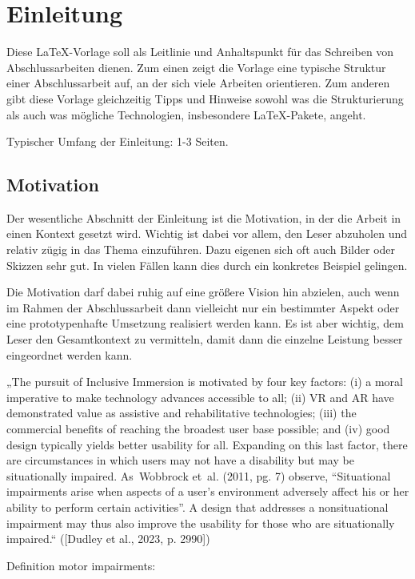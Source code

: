 \chapter{Einleitung}

Diese \LaTeX-Vorlage soll als Leitlinie und Anhaltspunkt für das Schreiben von Abschlussarbeiten dienen. Zum einen zeigt die Vorlage eine typische Struktur einer Abschlussarbeit auf, an der sich viele Arbeiten orientieren. Zum anderen gibt diese Vorlage gleichzeitig Tipps und Hinweise sowohl was die Strukturierung als auch was mögliche Technologien, insbesondere \LaTeX-Pakete, angeht.

Typischer Umfang der Einleitung: 1-3 Seiten.

\section{Motivation}

Der wesentliche Abschnitt der Einleitung ist die Motivation, in der die Arbeit in einen Kontext gesetzt wird. Wichtig ist dabei vor allem, den Leser abzuholen und relativ zügig in das Thema einzuführen. Dazu eigenen sich oft auch Bilder oder Skizzen sehr gut. In vielen Fällen kann dies durch ein konkretes Beispiel gelingen.

Die Motivation darf dabei ruhig auf eine größere Vision hin abzielen, auch wenn im Rahmen der Abschlussarbeit dann vielleicht nur ein bestimmter Aspekt oder eine prototypenhafte Umsetzung realisiert werden kann. Es ist aber wichtig, dem Leser den Gesamtkontext zu vermitteln, damit dann die einzelne Leistung besser eingeordnet werden kann.

„The pursuit of Inclusive Immersion is motivated by four key factors: (i) a moral imperative to make technology advances accessible to all; (ii) VR and AR have demonstrated value as assistive and rehabilitative technologies; (iii) the commercial benefits of reaching the broadest user base possible; and (iv) good design typically yields better usability for all. Expanding on this last factor, there are circumstances in which users may not have a disability but may be situationally impaired. As Wobbrock et al. (2011, pg. 7) observe, “Situational impairments arise when aspects of a user’s environment adversely affect his or her ability to perform certain activities”. A design that addresses a nonsituational impairment may thus also improve the usability for those who are situationally impaired.“ ([Dudley et al., 2023, p. 2990])

Definition motor impairments:
    
